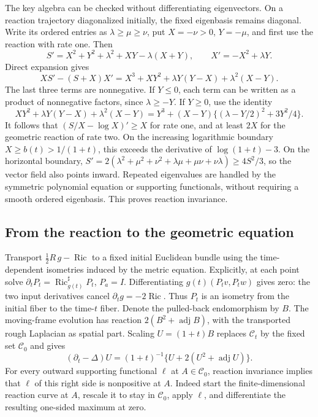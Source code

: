 The key algebra can be checked without differentiating eigenvectors.
On a reaction trajectory diagonalized initially, the fixed eigenbasis
remains diagonal.  Write its ordered entries as
$\lambda\geq\mu\geq\nu$, put $X=-\nu>0$, $Y=-\mu$, and first use the
reaction with rate one.  Then
\[
 S'=X^2+Y^2+\lambda^2+XY-\lambda(X+Y),\qquad
 X'=-X^2+\lambda Y.
\]
Direct expansion gives
\[
 XS'-(S+X)X'=X^3+
             XY^2+\lambda Y(Y-X)+\lambda^2(X-Y).
\]
The last three terms are nonnegative.  If $Y\leq0$, each term can be
written as a product of nonnegative factors, since $\lambda\geq-Y$.
If $Y\geq0$, use the identity
\[
 XY^2+\lambda Y(Y-X)+\lambda^2(X-Y)
 =Y^3+(X-Y)\{(\lambda-Y/2)^2+3Y^2/4\}.
\]
It follows that $(S/X-\log X)'\geq X$ for rate one, and at least $2X$
for the geometric reaction of rate two.  On the increasing logarithmic
boundary $X\geq b(t)>1/(1+t)$, this exceeds the derivative of
$\log(1+t)-3$.  On the horizontal boundary,
$S'=2(\lambda^2+\mu^2+\nu^2+\lambda\mu+\mu\nu+\nu\lambda)
\geq4S^2/3$, so the vector field also points inward.
Repeated eigenvalues are handled by the symmetric polynomial equation
or supporting functionals, without requiring a smooth ordered
eigenbasis.  This proves reaction invariance.

\subsection{From the reaction to the geometric equation}

Transport $\tfrac12R\,g-\operatorname{Ric}$ to a fixed initial Euclidean
bundle using the time-dependent isometries induced by the metric
equation.  Explicitly, at each point solve
$\partial_tP_t=\operatorname{Ric}_{g(t)}^{\sharp}P_t$, $P_a=I$.
Differentiating $g(t)(P_tv,P_tw)$ gives zero: the two input
derivatives cancel $\partial_tg=-2\operatorname{Ric}$.  Thus $P_t$
is an isometry from the initial fiber to the time-$t$ fiber.
Denote the pulled-back endomorphism by $B$.  The moving-frame
evolution has reaction $2(B^2+\operatorname{adj}B)$, with the transported
rough Laplacian as spatial part.  Scaling $U=(1+t)B$ replaces
$\mathcal C_t$ by the fixed set $\mathcal C_0$ and gives
\[
 (\partial_t-\Delta)U
       =(1+t)^{-1}\{U+2(U^2+\operatorname{adj}U)\}.
\]
For every outward supporting functional $\ell$ at $A\in\mathcal C_0$,
reaction invariance implies that $\ell$ of this right side is
nonpositive at $A$.  Indeed start the finite-dimensional reaction
curve at $A$, rescale it to stay in $\mathcal C_0$, apply $\ell$,
and differentiate the resulting one-sided maximum at zero.

